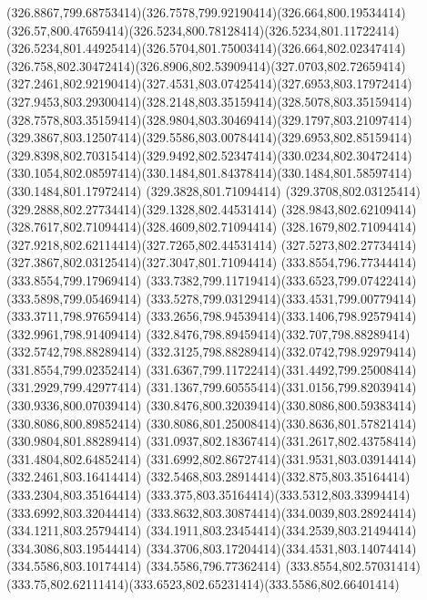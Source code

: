 {{	\curveto(326.8867,799.68753414)(326.7578,799.92190414)(326.664,800.19534414)
	\curveto(326.57,800.47659414)(326.5234,800.78128414)(326.5234,801.11722414)
	\curveto(326.5234,801.44925414)(326.5704,801.75003414)(326.664,802.02347414)
	\curveto(326.758,802.30472414)(326.8906,802.53909414)(327.0703,802.72659414)
	\curveto(327.2461,802.92190414)(327.4531,803.07425414)(327.6953,803.17972414)
	\curveto(327.9453,803.29300414)(328.2148,803.35159414)(328.5078,803.35159414)
	\curveto(328.7578,803.35159414)(328.9804,803.30469414)(329.1797,803.21097414)
	\curveto(329.3867,803.12507414)(329.5586,803.00784414)(329.6953,802.85159414)
	\curveto(329.8398,802.70315414)(329.9492,802.52347414)(330.0234,802.30472414)
	\curveto(330.1054,802.08597414)(330.1484,801.84378414)(330.1484,801.58597414)
	\lineto(330.1484,801.17972414)
	\closepath
	\moveto(329.3828,801.71094414)
	\curveto(329.3708,802.03125414)(329.2888,802.27734414)(329.1328,802.44531414)
	\curveto(328.9843,802.62109414)(328.7617,802.71094414)(328.4609,802.71094414)
	\curveto(328.1679,802.71094414)(327.9218,802.62114414)(327.7265,802.44531414)
	\curveto(327.5273,802.27734414)(327.3867,802.03125414)(327.3047,801.71094414)
	\closepath
	\moveto(333.8554,796.77344414)
	\lineto(333.8554,799.17969414)
	\curveto(333.7382,799.11719414)(333.6523,799.07422414)(333.5898,799.05469414)
	\curveto(333.5278,799.03129414)(333.4531,799.00779414)(333.3711,798.97659414)
	\curveto(333.2656,798.94539414)(333.1406,798.92579414)(332.9961,798.91409414)
	\curveto(332.8476,798.89459414)(332.707,798.88289414)(332.5742,798.88289414)
	\curveto(332.3125,798.88289414)(332.0742,798.92979414)(331.8554,799.02352414)
	\curveto(331.6367,799.11722414)(331.4492,799.25008414)(331.2929,799.42977414)
	\curveto(331.1367,799.60555414)(331.0156,799.82039414)(330.9336,800.07039414)
	\curveto(330.8476,800.32039414)(330.8086,800.59383414)(330.8086,800.89852414)
	\curveto(330.8086,801.25008414)(330.8636,801.57821414)(330.9804,801.88289414)
	\curveto(331.0937,802.18367414)(331.2617,802.43758414)(331.4804,802.64852414)
	\curveto(331.6992,802.86727414)(331.9531,803.03914414)(332.2461,803.16414414)
	\curveto(332.5468,803.28914414)(332.875,803.35164414)(333.2304,803.35164414)
	\curveto(333.375,803.35164414)(333.5312,803.33994414)(333.6992,803.32044414)
	\curveto(333.8632,803.30874414)(334.0039,803.28924414)(334.1211,803.25794414)
	\curveto(334.1911,803.23454414)(334.2539,803.21494414)(334.3086,803.19544414)
	\curveto(334.3706,803.17204414)(334.4531,803.14074414)(334.5586,803.10174414)
	\lineto(334.5586,796.77362414)
	\closepath
	\moveto(333.8554,802.57031414)
	\curveto(333.75,802.62111414)(333.6523,802.65231414)(333.5586,802.66401414)
}}
